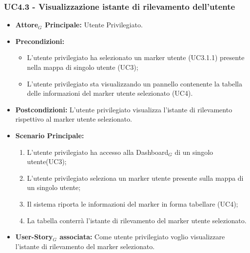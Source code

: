 \documentclass[11pt]{article}
\begin{document}
\begin{justify}
\subsubsection{\textbf{UC4.3 - Visualizzazione istante di rilevamento dell'utente}}
\label{UC4.3}
\begin{itemize}
     \item \textbf{Attore$_G$ Principale:} Utente Privilegiato.
     \item \textbf{Precondizioni:}
        \begin{itemize}
          \item L'utente privilegiato ha selezionato un marker utente (UC3.1.1) presente nella mappa di singolo utente (UC3);
          \item L'utente privilegiato sta visualizzando un pannello contenente la tabella delle informazioni del marker utente selezionato (UC4).
        \end{itemize}
      \item \textbf{Postcondizioni:} L'utente privilegiato visualizza l'istante di rilevamento rispettivo al marker utente selezionato. 
      \item \textbf{Scenario Principale:}
        \begin{enumerate}
            \item L'utente privilegiato ha accesso alla Dashboard$_G$ di un singolo utente(UC3);
            \item L'utente privilegiato seleziona un marker utente presente sulla mappa di un singolo utente;
            \item Il sistema riporta le informazioni del marker in forma tabellare (UC4);
            \item La tabella conterrà l'istante di rilevamento del marker utente selezionato.
        \end{enumerate}
     \item \textbf{User-Story$_G$ associata:}
       Come utente privilegiato voglio visualizzare l'istante di rilevamento del marker selezionato.
\end{itemize}

\end{justify}
\end{document}
